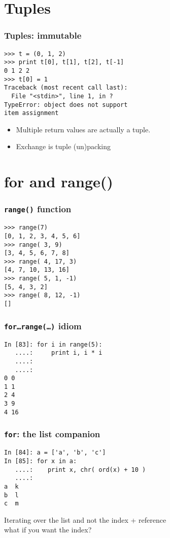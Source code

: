\documentclass[14pt,compress]{beamer}
\newcounter{time}
\newcommand{\inctime}[1]{\addtocounter{time}{#1}{\tiny \thetime\ m}}
\newcommand{\typ}[1]{\texttt{#1}}
\begin{document}
\section{Tuples}
\begin{frame}[fragile]
  \frametitle{Tuples: immutable}
\begin{lstlisting}
>>> t = (0, 1, 2)
>>> print t[0], t[1], t[2], t[-1] 
0 1 2 2
>>> t[0] = 1
Traceback (most recent call last):
  File "<stdin>", line 1, in ?
TypeError: object does not support
item assignment
\end{lstlisting}  
\begin{itemize}
    \item Multiple return values are actually a tuple.
    \item Exchange is tuple (un)packing
\end{itemize}
\inctime{5}
\end{frame}


\section{for and range()}
\begin{frame}[fragile]
  \frametitle{\typ{range()} function}
  \begin{lstlisting}
>>> range(7)
[0, 1, 2, 3, 4, 5, 6]
>>> range( 3, 9)
[3, 4, 5, 6, 7, 8]
>>> range( 4, 17, 3)
[4, 7, 10, 13, 16]
>>> range( 5, 1, -1)
[5, 4, 3, 2]
>>> range( 8, 12, -1)
[]
  \end{lstlisting}
\end{frame}

\begin{frame}[fragile]
  \frametitle{\typ{for\ldots range(\ldots)} idiom}
  \begin{lstlisting}
In [83]: for i in range(5):
   ....:     print i, i * i
   ....:     
   ....:     
0 0
1 1
2 4
3 9
4 16
\end{lstlisting}
\end{frame}

\begin{frame}[fragile]
  \frametitle{\typ{for}: the list companion}
  
  \begin{lstlisting}
In [84]: a = ['a', 'b', 'c']
In [85]: for x in a:
   ....:    print x, chr( ord(x) + 10 )
   ....:
a  k
b  l
c  m
  \end{lstlisting}
  Iterating over the list and not the index + reference\\
  what if you want the index?
\end{frame}
\end{document}
